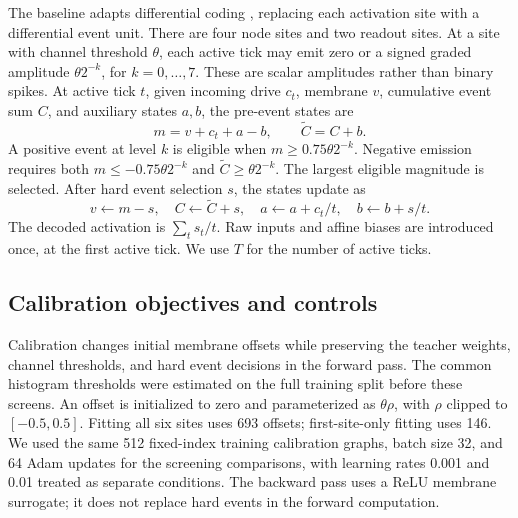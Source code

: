 \documentclass{article}
\begin{document}
The baseline adapts differential coding \cite{huang2025}, replacing each activation site with a differential event unit. There are four node sites and two readout sites. At a site with channel threshold $\theta$, each active tick may emit zero or a signed graded amplitude $\theta 2^{-k}$, for $k=0,\ldots,7$. These are scalar amplitudes rather than binary spikes. At active tick $t$, given incoming drive $c_t$, membrane $v$, cumulative event sum $C$, and auxiliary states $a,b$, the pre-event states are
\[
m=v+c_t+a-b,\qquad \widetilde C=C+b.
\]
A positive event at level $k$ is eligible when $m\geq 0.75\theta 2^{-k}$. Negative emission requires both $m\leq-0.75\theta 2^{-k}$ and $\widetilde C\geq\theta 2^{-k}$. The largest eligible magnitude is selected. After hard event selection $s$, the states update as
\[
v\leftarrow m-s,\quad C\leftarrow\widetilde C+s,\quad a\leftarrow a+c_t/t,\quad b\leftarrow b+s/t.
\]
The decoded activation is $\sum_t s_t/t$. Raw inputs and affine biases are introduced once, at the first active tick. We use $T$ for the number of active ticks.

\subsection{Calibration objectives and controls}

\label{sec:calibration_objectives_and_controls}

Calibration changes initial membrane offsets while preserving the teacher weights, channel thresholds, and hard event decisions in the forward pass. The common histogram thresholds were estimated on the full training split before these screens. An offset is initialized to zero and parameterized as $\theta\rho$, with $\rho$ clipped to $[-0.5,0.5]$. Fitting all six sites uses 693 offsets; first-site-only fitting uses 146. We used the same 512 fixed-index training calibration graphs, batch size 32, and 64 Adam updates for the screening comparisons, with learning rates 0.001 and 0.01 treated as separate conditions. The backward pass uses a ReLU membrane surrogate; it does not replace hard events in the forward computation.
\end{document}
